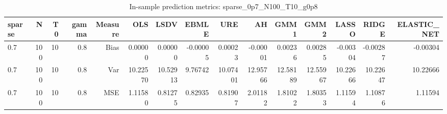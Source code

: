 \begin{table}[!htbp]\centering
\caption{In-sample prediction metrics: sparse_0p7_N100_T10_g0p8}
\label{tab:table2_sparse_0p7_N100_T10_g0p8}
\begin{tabular}{lrrrrrrrrrrrrrr}
\hline
sparse & N & T0 & gamma & Measure & OLS & LSDV & EBMLE & URE & AH & GMM1 & GMM2 & LASSO & RIDGE & ELASTIC_NET \\
\hline
0.7 & 100 & 10 & 0.8 & Bias & 0.00000 & 0.00000 & -0.00005 & 0.00023 & -0.00001 & 0.00236 & 0.00285 & -0.00304 & -0.00287 & -0.00304 \\
0.7 & 100 & 10 & 0.8 & Var & 10.22570 & 10.52913 & 9.76742 & 10.07401 & 12.95766 & 12.58189 & 12.55967 & 10.22666 & 10.22647 & 10.22666 \\
0.7 & 100 & 10 & 0.8 & MSE & 1.11580 & 0.81275 & 0.82935 & 0.81907 & 2.01182 & 1.81022 & 1.80353 & 1.11594 & 1.10876 & 1.11594 \\
\hline
\end{tabular}
\end{table}

